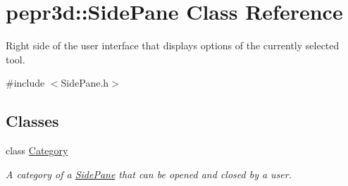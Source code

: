 \hypertarget{classpepr3d_1_1_side_pane}{}\section{pepr3d\+::Side\+Pane Class Reference}
\label{classpepr3d_1_1_side_pane}


Right side of the user interface that displays options of the currently selected tool.  




{\ttfamily \#include $<$Side\+Pane.\+h$>$}

\subsection*{Classes}
\begin{DoxyCompactItemize}
\item 
class \mbox{\hyperlink{classpepr3d_1_1_side_pane_1_1_category}{Category}}
\begin{DoxyCompactList}\small\item\em A category of a \mbox{\hyperlink{classpepr3d_1_1_side_pane}{Side\+Pane}} that can be opened and closed by a user. \end{DoxyCompactList}\end{DoxyCompactItemize}
